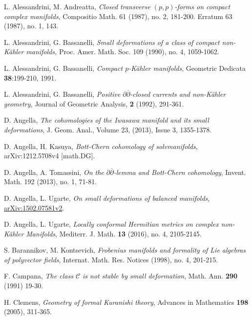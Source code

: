 \documentclass[12pt]{amsart}
\numberwithin{equation}{section}
\renewcommand{\1}{\mathds{1}}
\newcommand{\db}{\overline{\partial}}
\renewcommand{\>}{\rightarrow}
\newcommand{\p}{\partial}
\def\p{\partial}
\begin{document}
\begin{thebibliography}{99}

 L. Alessandrini, M. Andreatta,
\newblock \textit{Closed transverse $(p,p)$-forms on compact complex
manifolds},
\newblock  Compositio Math. 61 (1987), no. 2, 181-200. Erratum 63
(1987), no. 1, 143.

 L. Alessandrini, G. Bassanelli,
\newblock \textit{Small deformations
of a class of compact non-K\"ahler manifolds,}
\newblock Proc. Amer. Math. Soc. 109 (1990), no. 4, 1059-1062.

 L. Alessandrini, G. Bassanelli,
\newblock \textit{Compact $p$-K\"ahler manifolds},
\newblock Geometric Dedicata \textbf{38}:199-210, 1991.

 L. Alessandrini, G. Bassanelli,
\newblock \textit{Positive $\p \db$-closed currents and non-K\"ahler geometry},
\newblock Journal of Geometric Analysis, \textbf{2} (1992), 291-361.

 D. Angella,
\newblock \textit{The cohomologies of the Iwasawa manifold and its small
deformations}, J. Geom. Anal., Volume 23, (2013), Issue 3,
1355-1378.

 D. Angella, H. Kasuya,
\newblock \textit{Bott-Chern cohomology of solvmanifolds},
\newblock arXiv:1212.5708v4 [math.DG].

 D. Angella, A. Tomassini,
\newblock \textit{On the
$\partial\overline{\partial}$-lemma and Bott-Chern cohomology},
\newblock Invent. Math. 192 (2013), no. 1, 71-81.


 D. Angella, L. Ugarte,
\newblock \textit{On small deformations of balanced manifolds},
\newblock \href{http://arxiv.org/abs/1502.07581v2}{arXiv:1502.07581v2}.

 D. Angella, L. Ugarte,
\newblock \textit{Locally conformal Hermitian metrics on complex non-K\"ahler Manifolds},
\newblock Mediterr. J. Math. \textbf{13} (2016), no. 4, 2105-2145.

 S. Barannikov, M. Kontsevich,
\newblock \textit{Frobenius manifolds and formality of Lie algebras of
polyvector fields},
\newblock Internat. Math. Res. Notices (1998), no. 4, 201-215.



 F. Campana,
\newblock \textit{The class $\mathcal{C}$ is not stable by small deformation},
\newblock Math. Ann. \textbf{290} (1991) 19-30.


 H. Clemens,
\newblock \textit{Geometry of formal Kuranishi theory},
\newblock Advances in Mathematics \textbf{198} (2005), 311-365.


\end{thebibliography}
\end{document}
